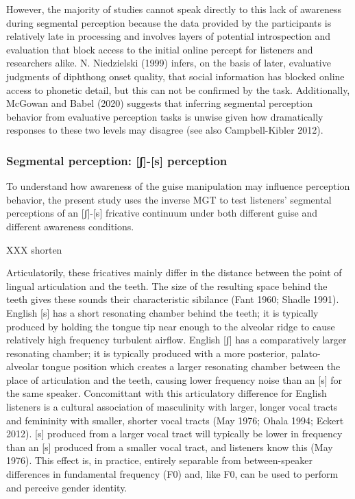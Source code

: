 \documentclass[
  letterpaper,
  DIV=11,
  numbers=noendperiod]{scrartcl}
\begin{document}
However, the majority of studies cannot speak directly to this lack of
awareness during segmental perception because the data provided by the
participants is relatively late in processing and involves layers of
potential introspection and evaluation that block access to the initial
online percept for listeners and researchers alike. N. Niedzielski
(1999) infers, on the basis of later, evaluative judgments of diphthong
onset quality, that social information has blocked online access to
phonetic detail, but this can not be confirmed by the task.
Additionally, McGowan and Babel (2020) suggests that inferring segmental
perception behavior from evaluative perception tasks is unwise given how
dramatically responses to these two levels may disagree (see also
Campbell-Kibler 2012).

\subsubsection{Segmental perception: {[}ʃ{]}-{[}s{]}
perception}\label{sub-fricative-gender}

To understand how awareness of the guise manipulation may influence
perception behavior, the present study uses the inverse MGT to test
listeners' segmental perceptions of an {[}ʃ{]}-{[}s{]} fricative
continuum under both different guise and different awareness conditions.

XXX shorten

Articulatorily, these fricatives mainly differ in the distance between
the point of lingual articulation and the teeth. The size of the
resulting space behind the teeth gives these sounds their characteristic
sibilance (Fant 1960; Shadle 1991). English {[}s{]} has a short
resonating chamber behind the teeth; it is typically produced by holding
the tongue tip near enough to the alveolar ridge to cause relatively
high frequency turbulent airflow. English {[}ʃ{]} has a comparatively
larger resonating chamber; it is typically produced with a more
posterior, palato-alveolar tongue position which creates a larger
resonating chamber between the place of articulation and the teeth,
causing lower frequency noise than an {[}s{]} for the same speaker.
Concomittant with this articulatory difference for English listeners is
a cultural association of masculinity with larger, longer vocal tracts
and femininity with smaller, shorter vocal tracts (May 1976; Ohala 1994;
Eckert 2012). {[}s{]} produced from a larger vocal tract will typically
be lower in frequency than an {[}s{]} produced from a smaller vocal
tract, and listeners know this (May 1976). This effect is, in practice,
entirely separable from between-speaker differences in fundamental
frequency (F0) and, like F0, can be used to perform and perceive gender
identity.
\end{document}
